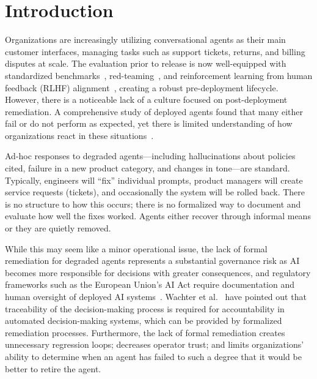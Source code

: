 \section{Introduction}
\label{sec:introduction}

Organizations are increasingly utilizing conversational agents as their main
customer interfaces, managing tasks such as support tickets, returns, and
billing disputes at scale. The evaluation prior to release is now well-equipped
with standardized benchmarks~\cite{liang2022holistic}, red-teaming~\cite{ganguli2022redteaming,perez2022redteaming},
and reinforcement learning from human feedback (RLHF)
alignment~\cite{ouyang2022instructions}, creating a robust pre-deployment
lifecycle. However, there is a noticeable lack of a culture focused on
post-deployment remediation. A comprehensive study of deployed agents found
that many either fail or do not perform as expected, yet there is limited
understanding of how organizations react in these situations~\cite{pan2025measuring}.

Ad-hoc responses to degraded agents---including hallucinations about policies
cited, failure in a new product category, and changes in tone---are standard.
Typically, engineers will ``fix'' individual prompts, product managers will
create service requests (tickets), and occasionally the system will be rolled
back. There is no structure to how this occurs; there is no formalized way to
document and evaluate how well the fixes worked. Agents either recover through
informal means or they are quietly removed.

While this may seem like a minor operational issue, the lack of formal
remediation for degraded agents represents a substantial governance risk as AI
becomes more responsible for decisions with greater consequences, and
regulatory frameworks such as the European Union's AI Act require documentation
and human oversight of deployed AI systems~\cite{eu2024aiact}. Wachter et
al.~\cite{wachter2017counterfactual} have pointed out that traceability of the
decision-making process is required for accountability in automated decision-making
systems, which can be provided by formalized remediation processes. Furthermore, the
lack of formal remediation creates unnecessary regression loops; decreases
operator trust; and limits organizations' ability to determine when an agent
has failed to such a degree that it would be better to retire the agent.

